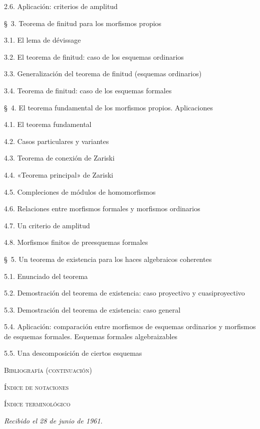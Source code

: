 \documentclass[10pt,oneside,openany]{book}
\theoremstyle{egaenv}\newtheorem*{env}{---}
\theoremstyle{egastatement}
\theoremstyle{egadescription}
\newcommand{\oldpage}[2][]{\marginnote{\normalfont\scriptsize\textbf{#1}\,|\,#2}\ignorespaces}
\begin{document}
\begin{flushleft}
2.6. Aplicación: criterios de amplitud 

\medskip
\S~3. Teorema de finitud para los morfismos propios 

3.1. El lema de dévissage 

3.2. El teorema de finitud: caso de los esquemas ordinarios 

3.3. Generalización del teorema de finitud (esquemas ordinarios) 

3.4. Teorema de finitud: caso de los esquemas formales 

\medskip
\S~4. El teorema fundamental de los morfismos propios. Aplicaciones 

4.1. El teorema fundamental 

4.2. Casos particulares y variantes 

4.3. Teorema de conexión de Zariski 

4.4. «Teorema principal» de Zariski 

4.5. Compleciones de módulos de homomorfismos 

4.6. Relaciones entre morfismos formales y morfismos ordinarios 

4.7. Un criterio de amplitud 

4.8. Morfismos finitos de preesquemas formales 

\oldpage[III]{167}

\S~5. Un teorema de existencia para los haces algebraicos coherentes 

5.1. Enunciado del teorema 

5.2. Demostración del teorema de existencia: caso proyectivo y cuasiproyectivo

5.3. Demostración del teorema de existencia: caso general 

5.4. Aplicación: comparación entre morfismos de esquemas ordinarios y
morfismos de esquemas formales. Esquemas formales algebraizables 

5.5. Una descomposición de ciertos esquemas 

\medskip
\textsc{Bibliografía (continuación)} 

\textsc{Índice de notaciones} 

\textsc{Índice terminológico} 

\begin{flushright}
\emph{Recibido el 28 de junio de 1961.}
\end{flushright}
\end{flushleft}
\end{document}
